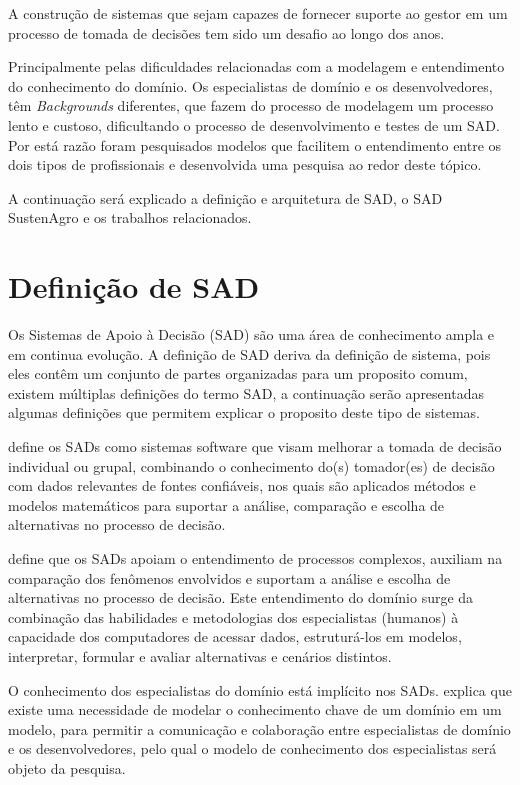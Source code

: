 A construção de sistemas que sejam capazes de fornecer suporte ao
gestor em um processo de tomada de decisões tem sido um desafio ao
longo dos anos. 

Principalmente pelas dificuldades relacionadas com a modelagem e entendimento
do conhecimento do domínio. Os especialistas de domínio e os desenvolvedores,
têm \foreignlanguage{english}{\emph{Backgrounds}} diferentes, que
fazem do processo de modelagem um processo lento e custoso, dificultando
o processo de desenvolvimento e testes de um SAD. Por está razão  foram
pesquisados modelos que facilitem o entendimento entre os dois tipos
de profissionais e desenvolvida uma pesquisa ao redor deste tópico.

A continuação será explicado a definição e arquitetura de SAD, o SAD
SustenAgro e os trabalhos relacionados.

\section{Definição de SAD}

Os Sistemas de Apoio à Decisão (SAD) são uma área de conhecimento
ampla e em continua evolução. A definição de SAD deriva da definição
de sistema, pois eles contêm um conjunto de partes organizadas para
um proposito comum, existem múltiplas definições do termo SAD, a continuação
serão apresentadas algumas definições que permitem explicar o proposito
deste tipo de sistemas.

\citet{Tweedale2016} define os SADs como sistemas software que visam
melhorar a tomada de decisão individual ou grupal, combinando o conhecimento
do(s) tomador(es) de decisão com dados relevantes de fontes confiáveis,
nos quais são aplicados métodos e modelos matemáticos para suportar
a análise, comparação e escolha de alternativas no processo de decisão.

\citet{heinzle2010semantica} define que os SADs apoiam o entendimento
de processos complexos, auxiliam na comparação dos fenômenos envolvidos
e suportam a análise e escolha de alternativas no processo de decisão.
Este entendimento do domínio surge da combinação das habilidades e
metodologias dos especialistas (humanos) à capacidade dos computadores
de acessar dados, estruturá-los em modelos, interpretar, formular
e avaliar alternativas e cenários distintos.

O conhecimento dos especialistas do domínio está implícito nos SADs.
\citet{Evans:2003:DDT:861502} explica que existe uma necessidade
de modelar o conhecimento chave de um domínio em um modelo, para permitir
a comunicação e colaboração entre especialistas de domínio e os desenvolvedores,
pelo qual o modelo de conhecimento dos especialistas será objeto da
pesquisa. 

